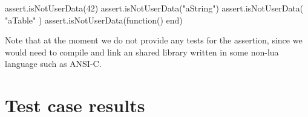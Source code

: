 \startLuaTest
  assert.isNotUserData(42)
  assert.isNotUserData("aString")
  assert.isNotUserData({ "aTable" })
  assert.isNotUserData(function() end)
\stopLuaTest
\stopTestCase

\godown[2ex]
Note that at the moment we do not provide any  tests for 
the  assertion, since we would need to compile 
and link an shared library written in some non-lua language such as 
ANSI-C. 

\stopTestSuite

\section{Test case results}

\reportLuaStats

\reportFailures

\stopchapter
